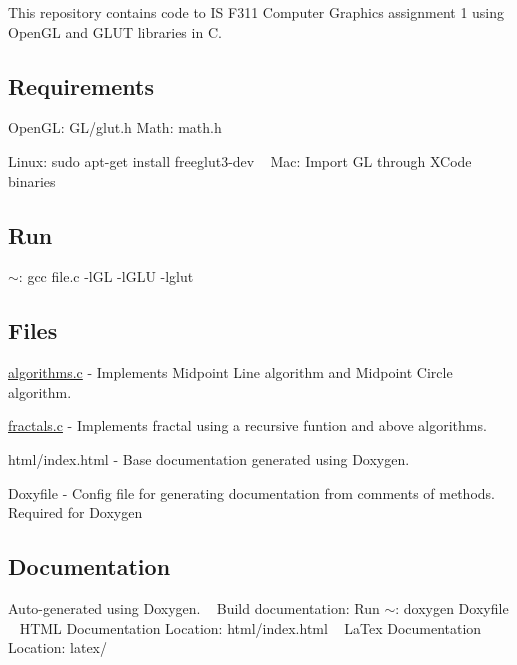 This repository contains code to IS F311 Computer Graphics assignment 1 using Open\+GL and G\+L\+UT libraries in C.

\subsection*{Requirements}

Open\+GL\+: G\+L/glut.\+h Math\+: math.\+h

Linux\+: {\ttfamily sudo apt-\/get install freeglut3-\/dev} ~\newline
Mac\+: {\ttfamily Import GL through X\+Code binaries}

\subsection*{Run}

$\sim$\+: {\ttfamily gcc file.\+c -\/l\+GL -\/l\+G\+LU -\/lglut}

\subsection*{Files}


\begin{DoxyEnumerate}
\item \hyperlink{algorithms_8c}{algorithms.\+c} -\/ Implements Midpoint Line algorithm and Midpoint Circle algorithm.
\item \hyperlink{fractals_8c}{fractals.\+c} -\/ Implements fractal using a recursive funtion and above algorithms.
\item html/index.\+html -\/ Base documentation generated using Doxygen.
\item Doxyfile -\/ Config file for generating documentation from comments of methods. Required for Doxygen
\end{DoxyEnumerate}

\subsection*{Documentation}

Auto-\/generated using Doxygen. ~\newline
Build documentation\+: Run $\sim$\+: {\ttfamily doxygen Doxyfile} ~\newline
H\+T\+ML Documentation Location\+: {\ttfamily html/index.\+html} ~\newline
La\+Tex Documentation Location\+: {\ttfamily latex/} 